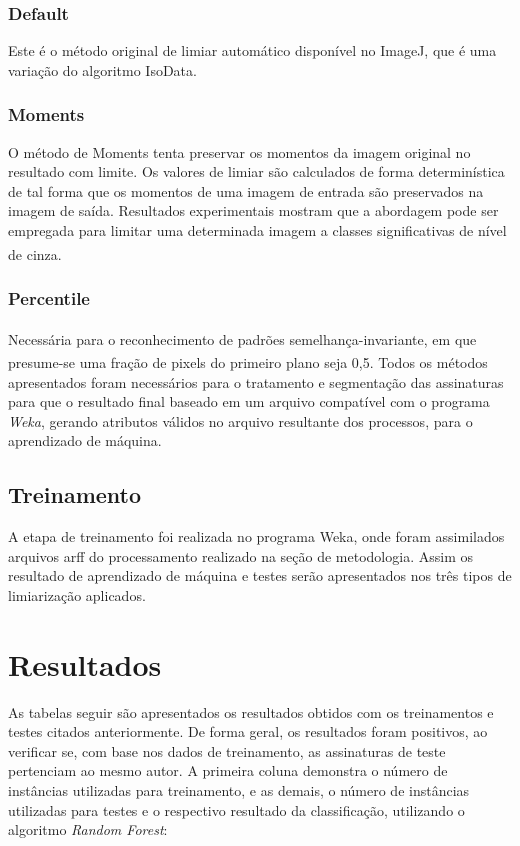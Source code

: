 \documentclass[12pt]{article}
\begin{document}
			\subsubsection{Default}
				Este é o método original de limiar automático disponível no ImageJ, que é uma variação do algoritmo IsoData.
			\subsubsection{Moments}
				O método de Moments tenta preservar os momentos da imagem original no resultado com limite. Os valores de limiar são calculados de forma determinística de tal forma que os momentos de uma imagem de entrada são preservados na imagem de saída. Resultados experimentais mostram que a abordagem pode ser empregada para limitar uma determinada imagem a classes significativas de nível de cinza\textsuperscript{\cite{eliceiri2017}}.
			\subsubsection{Percentile}
				Necessária para o reconhecimento de padrões semelhança-invariante\textsuperscript{\cite{doyle1962}}, em que presume-se uma fração de pixels do primeiro plano seja 0,5\textsuperscript{\cite{eliceiri2017}}.
				Todos os métodos apresentados foram necessários para o tratamento e segmentação das assinaturas para que o resultado final baseado em um arquivo compatível com o programa \textit{Weka}, gerando atributos válidos no arquivo resultante dos processos, para o aprendizado de máquina.
		\subsection{Treinamento}
			A etapa de treinamento foi realizada no programa Weka, onde foram assimilados arquivos arff do processamento realizado na seção de metodologia. Assim os resultado de aprendizado de máquina e testes serão apresentados nos três tipos de limiarização aplicados.
		
	\section{Resultados}
		As tabelas seguir são apresentados os resultados obtidos com os treinamentos e testes citados anteriormente. De forma geral, os resultados foram positivos, ao verificar se, com base nos dados de treinamento, as assinaturas de teste pertenciam ao mesmo autor. A primeira coluna demonstra o número de instâncias utilizadas para treinamento, e as demais, o número de instâncias utilizadas para testes e o respectivo resultado da classificação, utilizando o algoritmo \textit{Random Forest}:
		
\end{document}
